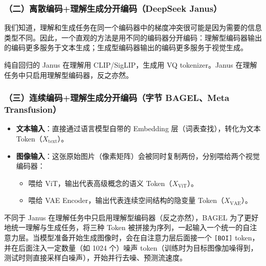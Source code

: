 \hypertarget{ux4e8cux79bbux6563ux7f16ux7801ux7406ux89e3ux751fux6210ux5206ux5f00ux7f16ux7801deepseek-janus}{%
\subsubsection{（二）离散编码+理解生成分开编码（DeepSeek Janus）}\label{ux4e8cux79bbux6563ux7f16ux7801ux7406ux89e3ux751fux6210ux5206ux5f00ux7f16ux7801deepseek-janus}}

我们知道，理解和生成任务在同一个编码器中的梯度冲突很可能是因为需要的信息类型不同。因此，一个直观的方法是用不同的编码器分开编码：理解型编码器输出的编码更多服务于文本生成；生成型编码器输出的编码更多服务于视觉生成。

纯自回归的 Janus 在理解用 CLIP/SigLIP，生成用 VQ tokenizer。Janus 在理解任务中只启用理解型编码器，反之亦然。

\hypertarget{ux4e09ux8fdeux7eedux7f16ux7801ux7406ux89e3ux751fux6210ux5206ux5f00ux7f16ux7801ux5b57ux8282-bagelmeta-transfusion}{%
\subsubsection{（三）连续编码+理解生成分开编码（字节 BAGEL、Meta Transfusion）}\label{ux4e09ux8fdeux7eedux7f16ux7801ux7406ux89e3ux751fux6210ux5206ux5f00ux7f16ux7801ux5b57ux8282-bagelmeta-transfusion}}

\begin{itemize}
\tightlist
\item
  \textbf{文本输入}：直接通过语言模型自带的 Embedding 层（词表查找），转化为文本 Token（\(X_{\mathrm{text}}\)）。
\item
  \textbf{图像输入}：这张原始图片（像素矩阵）会被同时复制两份，分别喂给两个视觉编码器：

  \begin{itemize}
  \tightlist
  \item
    喂给 ViT，输出代表高级概念的语义 Token（\(X_{\mathrm{ViT}}\)）。
  \item
    喂给 VAE Encoder，输出代表连续空间结构的隐变量 Token（\(X_{\mathrm{VAE}}\)）。
  \end{itemize}
\end{itemize}

不同于 Janus 在理解任务中只启用理解型编码器（反之亦然），BAGEL 为了更好地统一理解与生成任务，将三种 Token 被拼接为序列，一起输入一个统一的自注意力层。当模型准备开始生成图像时，会在自注意力层后面接一个 \texttt{{[}BOI{]}} token，并在后面注入一定数量（如 1024 个）噪声 token（训练时为目标图像加噪得到，测试时则直接采样白噪声），开始并行去噪、预测流速度。

